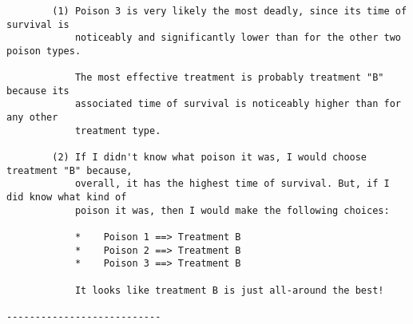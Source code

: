 \documentclass[11pt]{article}
\begin{document}
    \begin{center}
    \end{center}
    { \hspace*{\fill} \\}
    
    \begin{center}
    \end{center}
    { \hspace*{\fill} \\}
    
    \begin{Verbatim}[commandchars=\\\{\}]

        (1) Poison 3 is very likely the most deadly, since its time of survival is 
            noticeably and significantly lower than for the other two poison types.
            
            The most effective treatment is probably treatment "B" because its 
            associated time of survival is noticeably higher than for any other 
            treatment type.
    
        (2) If I didn't know what poison it was, I would choose treatment "B" because, 
            overall, it has the highest time of survival. But, if I did know what kind of 
            poison it was, then I would make the following choices:
            
            *    Poison 1 ==> Treatment B
            *    Poison 2 ==> Treatment B
            *    Poison 3 ==> Treatment B
            
            It looks like treatment B is just all-around the best!
        
---------------------------

    \end{Verbatim}

    \begin{center}
    \end{center}
    { \hspace*{\fill} \\}
    
    \begin{center}
    \end{center}
    { \hspace*{\fill} \\}
    
\end{document}
